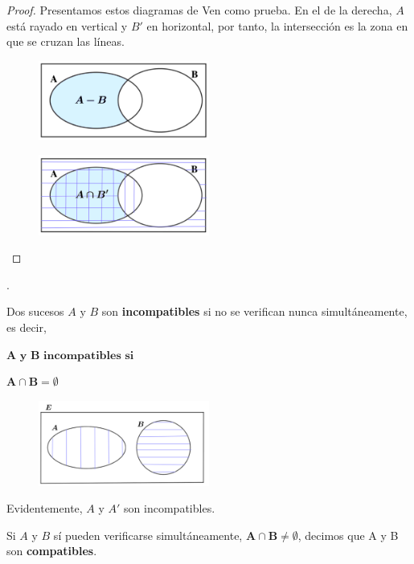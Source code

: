 \begin{proof}
Presentamos estos diagramas de Ven como prueba. En el de la derecha, $A$ está rayado en vertical y $B'$ en horizontal, por tanto, la intersección es la zona en que se cruzan las líneas.	
	\begin{multicols}{2}
	\begin{figure}[H]
			\centering
			\includegraphics[width=0.5\textwidth]{imagenes/imagenes02/T02IM07.png}
	\end{figure}
	\begin{figure}[H]
			\centering
			\includegraphics[width=0.5\textwidth]{imagenes/imagenes02/T02IM08.png}
	\end{figure}
	\end{multicols}
\end{proof}

\begin{definition}
.
\begin{multicols}{2}
	Dos sucesos $A \text{ y } B$ son \textbf{incompatibles} si no se verifican nunca simultáneamente, es decir,

$\boldsymbol{ A \text{ y } B  \textbf{ incompatibles si }}$

$\boldsymbol{ A\cap B=\emptyset }$	


	\begin{figure}[H]
			\centering
			\includegraphics[width=0.5\textwidth]{imagenes/imagenes02/T02IM06.png}
	\end{figure}
\end{multicols}

Evidentemente, $A$ y $A'$ son incompatibles.

Si $A$ y $B$ sí pueden verificarse simultáneamente, $\boldsymbol{A\cap B\neq \emptyset}$, decimos que A y B son \textbf{compatibles}.
\end{definition}


